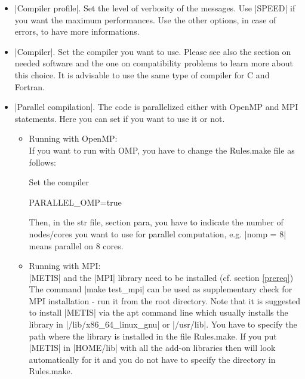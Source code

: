 \begin{itemize}

\item |Compiler profile|. Set the level of verbosity of the messages. Use
|SPEED| if you want the maximum performances. Use the other options, in
case of errors, to have more informations.

\item |Compiler|. Set the compiler you want to use. Please see also
the section on needed software and the one on compatibility problems to
learn more about this choice. It is advisable to use the same type of
compiler for C and Fortran.


\item |Parallel compilation|. The code is parallelized either with OpenMP and MPI statements.
Here you can set if you want to use it or not.

\begin{itemize}
\item Running with OpenMP: \\
If you want to run with OMP, you have to change the Rules.make file as follows:

Set the compiler
\begin{codem}
 PARALLEL_OMP=true
\end{codem}

Then, in the str file, section para, you have to indicate the number of nodes/cores you want to use for parallel computation, e.g. |nomp = 8| means parallel on 8 cores.

\item Running with MPI: \\
|METIS| and the |MPI| library need to be installed (cf. section \ref{prereq})
The command |make test_mpi| can be used as supplementary check for
MPI installation - run it from the \shy{} root directory.
Note that it is suggested to install |METIS| via the apt command line
which usually installs the library in |/lib/x86\_64\_linux\_gnu| or |/usr/lib|.
You have to specify the path where the library is installed in the file Rules.make.
If you put |METIS| in |HOME/lib| with all the add-on libraries then \shy{} will
look automatically for it and you do not have to specify the directory in Rules.make. \\


\end{itemize}
\end{itemize}
